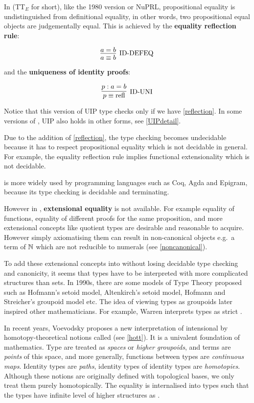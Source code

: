 In \ett (TT$_E$ for short), like the 1980 version \cite{martin1984intuitionistic} or NuPRL, propositional equality is undistinguished from definitional equality, in other words, two propositional equal objects are judgementally equal. This is achieved by the \textbf{equality reflection rule}:

\begin{equation}
\label{reflection}
\infer[\text{ID-DEFEQ}]{a \equiv b}{a = b}
\end{equation}

and the \textbf{uniqueness of identity proofs}:

\begin{equation}
\label{ID-Uni}
\infer[\text{ID-UNI}]{p \equiv \text{refl}}{p : a = b}
\end{equation}

Notice that this version of UIP type checks only if we have \ref{reflection}. In some versions of \itt, UIP also holds in other forms, see \autoref{UIPdetail}. 

Due to the addition of \ref{reflection}, the type checking becomes undecidable because it has to respect propositional equality which is not decidable in general. For example, the equality reflection rule implies functional extensionality which is not decidable.

\itt is more widely used by programming languages such as Coq, Agda and Epigram, because its type checking is decidable and terminating.

However in \itt, \textbf{extensional equality} is not available. For example equality of functions, equality of different proofs for the same proposition, and more extensional concepts like quotient types are desirable and reasonable to acquire. However simply axiomatising them can result in non-canonical objects e.g.\ a term of $\mathbb{N}$ which are not reducible to numerals (see \autoref{noncanonical}). 


To add these extensional concepts into \itt without losing decidable type checking and canonicity, it seems that types have to be interpreted with more complicated structures than sets.
In 1990s, there are some models of Type Theory proposed such as Hofmann's setoid model, Altenkirch's setoid model, Hofmann and Streicher's groupoid model etc.
The idea of viewing types as groupoids later inspired other mathematicians. For example, Warren \cite{Warren} interprets types as strict \og.

In recent years, Voevodsky proposes a new interpretation of intensional \mltt by homotopy-theoretical notions \cite{klv:ssetmodel,voe:06} called \hott (see \autoref{hott}). It is a univalent foundation of mathematics. 
Type are treated as \emph{spaces} or \emph{higher groupoids}, and terms are \emph{points} of this space, and more generally, functions between types are \emph{continuous maps}. Identity types are \emph{paths}, identity types of identity types are \emph{homotopies}. Although these notions are originally defined with topological bases, we only treat them purely homotopically. The equality is internalised into types such that the types have infinite level of higher structures as \wog.


